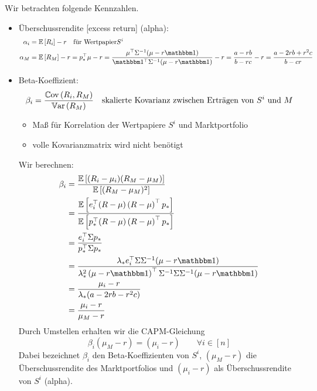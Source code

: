 Wir betrachten folgende Kennzahlen.
\begin{itemize}
	\item Überschussrendite [excess return] (alpha):
	\begin{equation*}
		\begin{aligned}
		\alpha_i &= \EW[R_i] - r \quad \text{für Wertpapier} S^i \\
		\alpha_M 
		&= \EW[R_M] - r = \trans{p_\ast} \mu - r 
		= \frac{\trans{\mu} \Sigma^{-1} (\mu - r \one)}{\trans{\one} \Sigma^{-1} (\mu - r \one)} - r 
		= \frac{a - rb}{b - rc} - r 
		= \frac{a - 2rb + r^2 c}{b - cr}
		\end{aligned}
	\end{equation*}
	\item Beta-Koeffizient:
	\begin{equation*}
		\beta_i = \frac{\Cov{R_i}{R_M}}{\Var[R_M]} \quad \text{skalierte Kovarianz zwischen Erträgen von } S^i \und M
	\end{equation*}
	\begin{itemize}[nolistsep]
		\item Maß für Korrelation der Wertpapiere $S^i$ und Marktportfolio
		\item volle Kovarianzmatrix wird nicht benötigt
	\end{itemize}
	Wir berechnen:
	\begin{equation*}
		\begin{aligned}
			\beta_i 
			&= \frac{\EW[(R_i - \mu_i)(R_M - \mu_M)]}{\EW[(R_M - \mu_M)^2]} \\
			&= \frac{\EW[\trans{e_i}(R-\mu)\transpose{R-\mu}p_\ast]}{\EW[\trans{p_\ast} (R-\mu) \transpose{R-\mu} p_\ast]} \\
			&= \frac{\trans{e_i} \Sigma p_\ast}{\trans{p_\ast}\Sigma p_\ast} \\
			&= \frac{\lambda_\ast \trans{e_i} \Sigma \Sigma^{-1} (\mu - r \one)}{\lambda_\ast^2 \transpose{\mu - r\one} \Sigma^{-1} \Sigma \Sigma^{-1} (\mu - r\one)} \\
			&= \frac{\mu_i - r}{\lambda_\ast (a-2rb - r^2 c)} \\
			&= \frac{\mu_i - r}{\mu_M - r}
		\end{aligned}
	\end{equation*}
	Durch Umstellen erhalten wir die CAPM-Gleichung
	\begin{equation*}
		\beta_i (\mu_M - r) = (\mu_i - r) \qquad \forall i \in [n]
	\end{equation*}
	Dabei bezeichnet $\beta_i$ den Beta-Koeffizienten von $S^i$, $(\mu_M - r)$ die Überschussrendite des Marktportfolios und $(\mu_i - r)$ als Überschussrendite von $S^i$ (alpha). 

\end{itemize}
